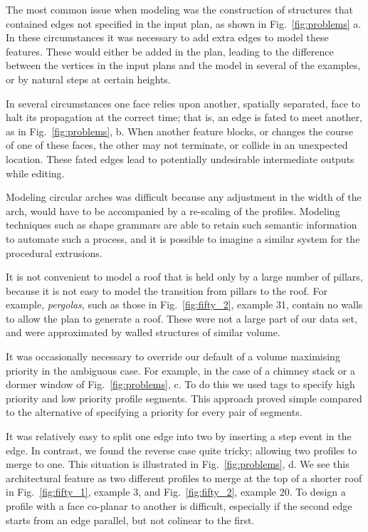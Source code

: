 The most common issue when modeling was the construction of structures that contained edges not specified in the input plan, as shown in Fig.~\ref{fig:problems} a. In these circumstances it was necessary to add extra edges to model these features. These would either be added in the plan, leading to the difference between the vertices in the input plans and the model in several of the examples, or by natural steps at certain heights.

In several circumstances one face relies upon another, spatially separated, face to halt its propagation at the correct time; that is, an edge is fated to meet another, as in Fig.~\ref{fig:problems}, b. When another feature blocks, or changes the course of one of these faces, the other may not terminate, or collide in an unexpected location. These fated edges lead to potentially undesirable intermediate outputs while editing.

Modeling circular arches was difficult because any adjustment in the width of the arch, would have to be accompanied by a re-scaling of the profiles. Modeling techniques such as shape grammars are able to retain such semantic information to automate such a process, and it is possible to imagine a similar system for the procedural extrusions.

It is not convenient to model a roof that is held only by a large number of pillars, because it is not easy to model the transition from pillars to the roof. For example, \emph{pergolas}, such as those in Fig.~\ref{fig:fifty_2}, example 31, contain no walls to allow the plan to generate a roof. These were not a large part of our data set, and were approximated by walled structures of similar volume.

It was occasionally necessary to override our default of a volume maximising priority in the ambiguous case. For example, in the case of a chimney stack or a dormer window of Fig.~\ref{fig:problems}, c. To do this we used tags to specify high priority and low priority profile segments. This approach proved simple compared to the alternative of specifying a priority for every pair of segments.

It was relatively easy to split one edge into two by inserting a step event in the edge. In contrast, we found the reverse case quite tricky; allowing two profiles to merge to one. This situation is illustrated in Fig.~\ref{fig:problems}, d. We see this architectural feature as two different profiles to merge at the top of a shorter roof in Fig.~\ref{fig:fifty_1}, example 3, and Fig.~\ref{fig:fifty_2}, example 20. To design a profile with a face co-planar to another is difficult, especially if the second edge starts from an edge parallel, but not colinear to the first.

